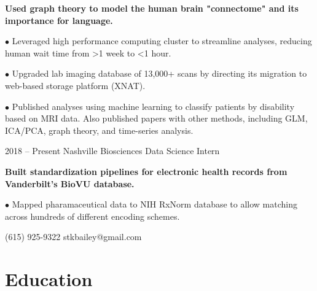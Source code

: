 \documentclass{tccv}
\begin{document}
\begin{eventlist}
     \textbf{Used graph theory to model the human brain "connectome" and its importance for language.} 
     \newline

\begin{factlist}
    \item{$\bullet$}
         {Leveraged high performance computing cluster to streamline analyses, reducing human wait time from \textgreater 1 week to \textless 1 hour.}
         
    \item{$\bullet$}
         {Upgraded lab imaging database of 13,000+ scans by directing its migration to web-based storage platform (XNAT).}
         
    \item{$\bullet$}
         {Published analyses using machine learning to classify patients by disability based on MRI data. Also published papers with other methods, including GLM, ICA/PCA, graph theory, and time-series analysis.}
         
\end{factlist}


\smallskip

\item{2018 -- Present}
     {Nashville Biosciences}
     {Data Science Intern}

    \textbf{Built standardization pipelines for electronic health records from Vanderbilt's BioVU database.}
    \newline

\begin{factlist}
    \item{$\bullet$}
        {Mapped pharamaceutical data to NIH RxNorm database to allow matching across hundreds of different encoding schemes.}
\end{factlist}


\end{eventlist}



    {(615) 925-9322}
    {stkbailey@gmail.com}

\section{Education}
\end{document}
